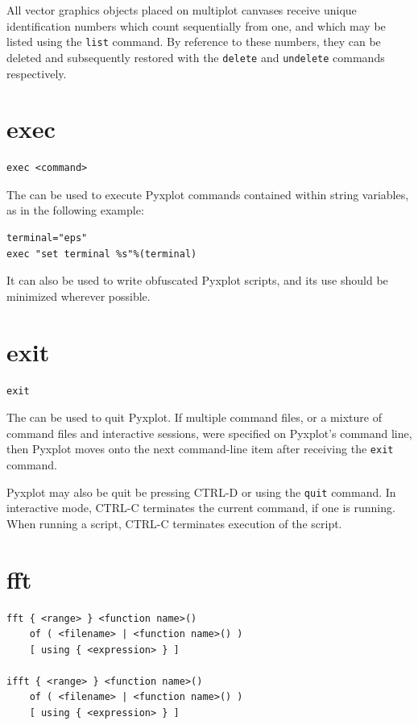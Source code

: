 All vector graphics objects placed on multiplot canvases receive unique
identification numbers which count sequentially from one, and which may be
listed using the {\tt list} command.  By reference to these numbers, they can
be deleted and subsequently restored with the {\tt delete} and {\tt undelete}
commands respectively.


\section{exec}

\begin{verbatim}
exec <command>
\end{verbatim}

The  can be used to execute Pyxplot commands contained within
string variables, as in the following example:

\begin{verbatim}
terminal="eps"
exec "set terminal %s"%(terminal)
\end{verbatim}

\noindent It can also be used to write obfuscated Pyxplot scripts, and its use
should be minimized wherever possible.


\section{exit}

\begin{verbatim}
exit
\end{verbatim}

The  can be used to quit Pyxplot. If multiple command files,
or a mixture of command files and interactive sessions, were specified on
Pyxplot's command line, then Pyxplot moves onto the next command-line item
after receiving the {\tt exit} command.

Pyxplot may also be quit be pressing CTRL-D or using the {\tt quit} command. In
interactive mode, CTRL-C terminates the current command, if one is running.
When running a script, CTRL-C terminates execution of the script.


\section{fft}

\begin{verbatim}
fft { <range> } <function name>()
    of ( <filename> | <function name>() )
    [ using { <expression> } ]

ifft { <range> } <function name>()
    of ( <filename> | <function name>() )
    [ using { <expression> } ]
\end{verbatim}

